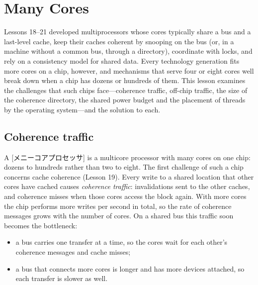 \documentclass[../main.tex]{subfiles}
\begin{document}
\chapter{Many Cores}

Lessons 18--21 developed multiprocessors whose cores typically share a bus
and a last-level cache, keep their caches coherent by snooping on the bus
(or, in a machine without a common bus, through a directory), coordinate
with locks, and rely on a consistency model for shared data.  Every
technology generation fits more cores on a chip, however, and mechanisms
that serve four or eight cores well break down when a chip has dozens or
hundreds of them.  This lesson examines the challenges
that such chips face---coherence traffic, off-chip traffic, the size of the
coherence directory, the shared power budget and the placement of threads
by the operating system---and the solution to each.

\section{Coherence traffic}
\label{sec:l22-coherence}

A [メニーコアプロセッサ] is a multicore processor
with many cores on one chip: dozens to hundreds rather than two to
eight.  The first challenge of
such a chip concerns cache coherence (Lesson 19).  Every write to a shared
location that other cores have cached causes \emph{coherence traffic}:
invalidations sent to the other caches, and coherence misses when those
cores access the block again.  With more cores the chip performs more writes
per second in total, so the rate of coherence messages grows with the
number of cores.  On a shared bus this traffic soon becomes the
bottleneck:
\begin{itemize}
  \item a bus carries one transfer at a time, so the cores wait for each
    other's coherence messages and cache misses;
  \item a bus that connects more cores is longer and has more devices
    attached, so each transfer is slower as well.
\end{itemize}
\end{document}

